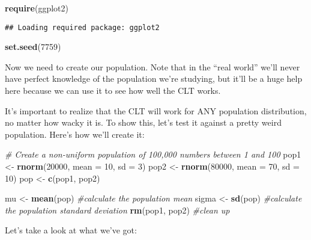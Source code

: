 \documentclass[]{article}
\newenvironment{Shaded}{\begin{snugshade}}{\end{snugshade}}
\newcommand{\KeywordTok}[1]{\textcolor[rgb]{0.13,0.29,0.53}{\textbf{{#1}}}}
\newcommand{\DataTypeTok}[1]{\textcolor[rgb]{0.13,0.29,0.53}{{#1}}}
\newcommand{\DecValTok}[1]{\textcolor[rgb]{0.00,0.00,0.81}{{#1}}}
\newcommand{\StringTok}[1]{\textcolor[rgb]{0.31,0.60,0.02}{{#1}}}
\newcommand{\CommentTok}[1]{\textcolor[rgb]{0.56,0.35,0.01}{\textit{{#1}}}}
\newcommand{\NormalTok}[1]{{#1}}
\begin{document}
\begin{Shaded}
\begin{Highlighting}[]
\KeywordTok{require}\NormalTok{(ggplot2)}
\end{Highlighting}
\end{Shaded}

\begin{verbatim}
## Loading required package: ggplot2
\end{verbatim}

\begin{Shaded}
\begin{Highlighting}[]
\KeywordTok{set.seed}\NormalTok{(}\DecValTok{7759}\NormalTok{)}
\end{Highlighting}
\end{Shaded}

Now we need to create our population. Note that in the ``real world''
we'll never have perfect knowledge of the population we're studying, but
it'll be a huge help here because we can use it to see how well the CLT
works.

It's important to realize that the CLT will work for ANY population
distribution, no matter how wacky it is. To show this, let's test it
against a pretty weird population. Here's how we'll create it:

\begin{Shaded}
\begin{Highlighting}[]
\CommentTok{# Create a non-uniform population of 100,000 numbers between 1 and 100}
\NormalTok{pop1 <-}\StringTok{ }\KeywordTok{rnorm}\NormalTok{(}\DecValTok{20000}\NormalTok{, }\DataTypeTok{mean =} \DecValTok{10}\NormalTok{, }\DataTypeTok{sd =} \DecValTok{3}\NormalTok{)}
\NormalTok{pop2 <-}\StringTok{ }\KeywordTok{rnorm}\NormalTok{(}\DecValTok{80000}\NormalTok{, }\DataTypeTok{mean =} \DecValTok{70}\NormalTok{, }\DataTypeTok{sd =} \DecValTok{10}\NormalTok{)}
\NormalTok{pop <-}\StringTok{ }\KeywordTok{c}\NormalTok{(pop1, pop2)}

\NormalTok{mu <-}\StringTok{ }\KeywordTok{mean}\NormalTok{(pop) }\CommentTok{#calculate the population mean}
\NormalTok{sigma <-}\StringTok{ }\KeywordTok{sd}\NormalTok{(pop) }\CommentTok{#calculate the population standard deviation}
\KeywordTok{rm}\NormalTok{(pop1, pop2) }\CommentTok{#clean up}
\end{Highlighting}
\end{Shaded}

Let's take a look at what we've got:
\end{document}

